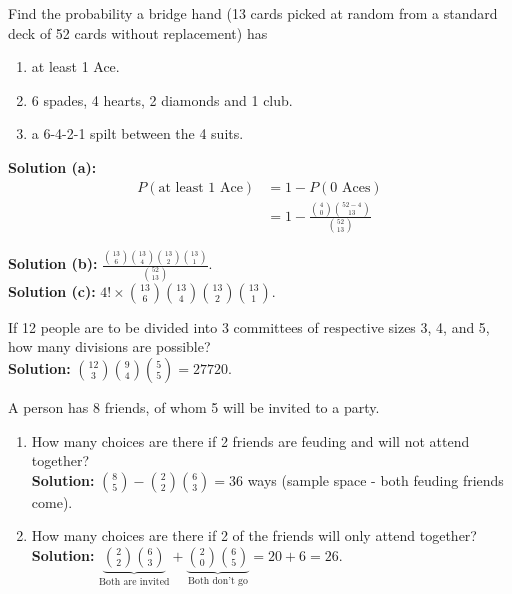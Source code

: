 \begin{example}
    Find the probability a bridge hand (13 cards picked at random from a standard deck of 52 cards without replacement) has
    \begin{enumerate}[label={(\alph*)}]
        \item at least 1 Ace.
        \item 6 spades, 4 hearts, 2 diamonds and 1 club.
        \item a 6-4-2-1 spilt between the 4 suits.
    \end{enumerate}
    \textbf{Solution (a): } \vspace*{-5mm}
    \begin{align*}
        P(\text{at least 1 Ace}) &= 1 - P(\text{0 Aces}) \\
        &= 1 - \frac{\binom{4}{0} \binom{52-4}{13}}{\binom{52}{13}}
    \end{align*}

    \textbf{Solution (b): } \vspace*{-3mm}
    $\frac{\binom{13}{6} \binom{13}{4} \binom{13}{2} \binom{13}{1}}{\binom{52}{13}}$. \\

    \textbf{Solution (c): } \vspace*{-3mm}
    $4! \times \binom{13}{6}\binom{13}{4}\binom{13}{2}\binom{13}{1}$. \vspace{2mm}
\end{example}

\begin{example}
    If 12 people are to be divided into 3 committees of respective sizes 3, 4, and 5,
    how many divisions are possible? \\
    \textbf{Solution: }
    $\binom{12}{3} \binom{9}{4} \binom{5}{5} = 27720$.
\end{example}

\begin{example}
    A person has 8 friends, of whom 5 will be invited to a party. 
    \begin{enumerate}[label=(\alph*)]
        \item How many choices are there if 2 friends are feuding and will not attend together? \\
        \textbf{Solution: } 
        $\binom{8}{5} - \binom{2}{2}\binom{6}{3} = 36$ ways (sample space - both feuding friends come).
        \item How many choices are there if 2 of the friends will only attend together? \\
        \textbf{Solution: }
        $\underbrace{\binom{2}{2} \binom{6}{3}}_{\text{Both are invited}}  + \underbrace{\binom{2}{0} \binom{6}{5}}_{\text{Both don't go}}  = 20 + 6 = 26$. 
    \end{enumerate}
\end{example}

